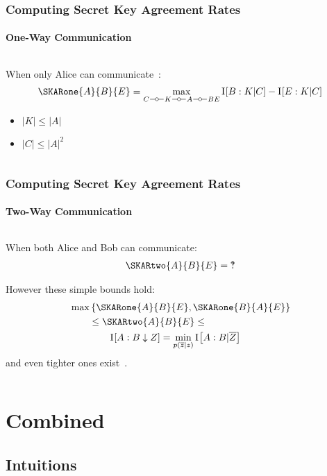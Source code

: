 \documentclass[final,serif,aspectratio=1610]{beamer}
\begin{document}
\begin{frame}
  \frametitle{Computing Secret Key Agreement Rates}
  \framesubtitle{One-Way Communication}
  \begin{columns}
    \begin{column}{1.0\textwidth}
      \Large
      When only Alice can communicate~\cite{ahlswede1993common}:
      \begin{align*}
        \SKARone{A}{B}{E} = \max_{C \markov K \markov A \markov BE} \I{B : K | C} - \I{E : K | C}
      \end{align*}

      \begin{itemize}
        \item $|K| \leq |A|$
        \item $|C| \leq |A|^2$
      \end{itemize}
    \end{column}
  \end{columns}
\end{frame}

\begin{frame}
  \frametitle{Computing Secret Key Agreement Rates}
  \framesubtitle{Two-Way Communication}
  \begin{columns}
    \begin{column}{1.0\textwidth}
      \Large
      When both Alice and Bob can communicate:
      \begin{align*}
        \SKARtwo{A}{B}{E} = \textrm{\textinterrobang}
      \end{align*}

      However these simple bounds hold:
      \begin{align*}
        &\max \left\{ \SKARone{A}{B}{E}, \SKARone{B}{A}{E} \right\} \\
        &\quad\quad \leq \SKARtwo{A}{B}{E} \leq \\
        &\quad\quad\quad\quad \I{A : B \downarrow Z} = \min_{p(\overline{z}|z)} \I{A : B | \overline{Z}}
      \end{align*}
      and even tighter ones exist~\cite{gohari2017coding}.
    \end{column}
  \end{columns}
\end{frame}

\section{Combined}

\subsection{Intuitions}
\end{document}

